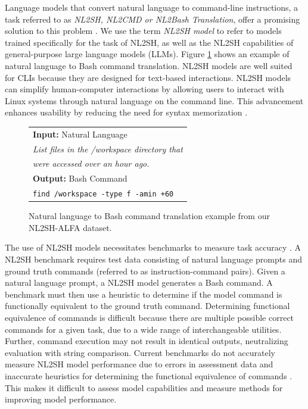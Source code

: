 \documentclass[11pt]{article}
\begin{document}
Language models that convert natural language to command-line instructions, a task referred to as \textit{NL2SH, NL2CMD or NL2Bash Translation}, offer a promising solution to this problem \cite{NL2CMD-Comp}. We use the term \textit{NL2SH model} to refer to models trained specifically for the task of NL2SH, as well as the NL2SH capabilities of general-purpose large language models (LLMs). Figure \ref{fig:example} shows an example of natural language to Bash command translation. NL2SH models are well suited for CLIs because they are designed for text-based interactions.  NL2SH models can simplify human-computer interactions by allowing users to interact with Linux systems through natural language on the command line. This advancement enhances usability by reducing the need for syntax memorization \cite{Sammet}.

\begin{figure}[ht!]
  \centering
  \small
  \begin{tabular}{l}
    \hline
    \textbf{Input:} Natural Language                     \\
    \textit{List files in the /workspace directory that} \\
    \textit{were accessed over an hour ago.}             \\
    \hline
    \textbf{Output:} Bash Command                        \\
    \texttt{find /workspace -type f -amin +60}           \\
    \hline
  \end{tabular}
  \caption{Natural language to Bash command translation example from our NL2SH-ALFA dataset.}
  \label{fig:example}
\end{figure}

The use of NL2SH models necessitates benchmarks to measure task accuracy \cite{warp, shell-gpt, copilot, msai, cwai}. A NL2SH benchmark requires test data consisting of natural language prompts and ground truth commands (referred to as instruction-command pairs). Given a natural language prompt, a NL2SH model generates a Bash command. A benchmark must then use a heuristic to determine if the model command is functionally equivalent to the ground truth command. Determining functional equivalence of commands is difficult because there are multiple possible correct commands for a given task, due to a wide range of interchangeable utilities. Further, command execution may not result in identical outputs, neutralizing evaluation with string comparison. Current benchmarks do not accurately measure NL2SH model performance due to errors in assessment data and inaccurate heuristics for determining the functional equivalence of commands \cite{InterCode,tsed,codesift}. This makes it difficult to assess model capabilities and measure methods for improving model performance.
\end{document}
